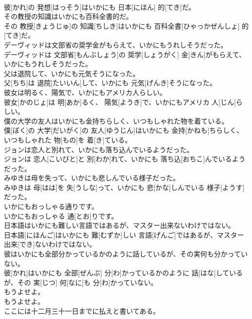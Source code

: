 \documentclass[8pt]{extreport}
\begin{document}
\begin{CJK}{UTF8}{min}
\\	彼[かれ]の 発想[はっそう]はいかにも 日本[にほん] 的[てき]だ。
\\	その教授の知識はいかにも百科全書的だ。	
\\	その 教授[きょうじゅ]の 知識[ちしき]はいかにも 百科全書[ひゃっかぜんしょ] 的[てき]だ。
\\	デーヴィッドは文部省の奨学金がもらえて、いかにもうれしそうだった。	
\\	デーヴィッドは 文部省[もんぶしょう]の 奨学[しょうがく] 金[きん]がもらえて、いかにもうれしそうだった。
\\	父は退院して、いかにも元気そうになった。	
\\	父[ちち]は 退院[たいいん]して、いかにも 元気[げんき]そうになった。
\\	彼女は明るく、陽気で、いかにもアメリカ人らしい。	
\\	彼女[かのじょ]は 明[あか]るく、 陽気[ようき]で、いかにもアメリカ 人[じん]らしい。
\\	僕の大学の友人はいかにも金持ちらしく、いつもしゃれた物を着ている。	
\\	僕[ぼく]の 大学[だいがく]の 友人[ゆうじん]はいかにも 金持[かねも]ちらしく、いつもしゃれた 物[もの]を 着[き]ている。
\\	ジョンは恋人と別れて、いかにも落ち込んでいるようだった。	
\\	ジョンは 恋人[こいびと]と 別[わか]れて、いかにも 落ち込[おちこ]んでいるようだった。
\\	みゆきは母を失って、いかにも悲しんでいる様子だった。	
\\	みゆきは 母[はは]を 失[うしな]って、いかにも 悲[かな]しんでいる 様子[ようす]だった。
\\	いかにもおっしゃる通りです。	
\\	いかにもおっしゃる 通[とお]りです。
\\	日本語はいかにも難しい言語ではあるが、マスター出来ないわけではない。	
\\	日本語[にほんご]はいかにも 難[むずか]しい 言語[げんご]ではあるが、マスター 出来[でき]ないわけではない。
\\	彼はいかにも全部分かっているかのように話しているが、その実何も分かっていない。	
\\	彼[かれ]はいかにも 全部[ぜんぶ] 分[わ]かっているかのように 話[はな]しているが、その 実[じつ] 何[なに]も 分[わ]かっていない。
\\	もうよせよ。	
\\	もうよせよ。
\\	ここには十二月三十一日までに払えと書いてある。	

\end{CJK}
\end{document}
